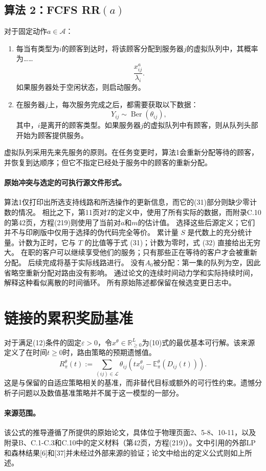 \documentclass{article}
\begin{document}
\subsection*{算法 2：FCFS RR$(a)$}

对于固定动作$a\in\mathcal A$：
\begin{enumerate}
\item 每当有类型为$i$的顾客到达时，将该顾客分配到服务器$j$的虚拟队列中，其概率为……
\[
\frac{x^a_{ij}}{\lambda_i}.
\]
如果服务器处于空闲状态，则启动服务。
\item 在服务器$j$上，每次服务完成之后，都需要获取以下数据：
\[
Y_{ij}\sim\operatorname{Ber}(\theta_{ij}),
\]
其中，$i$是离开的顾客类型。如果服务器$j$的虚拟队列中有顾客，则从队列头部开始为顾客提供服务。
\end{enumerate}
虚拟队列采用先来先服务的原则。在任务变更时，算法1会重新分配等待的顾客，并恢复到达顺序；但它不指定已经处于服务中的顾客的重新分配。

\paragraph{原始冲突与选定的可执行源文件形式。}
算法1仅打印出所选支持线路和所选操作的更新信息，而它的(31)部分则缺少零计数的情况。 相比之下，第11页对$T$的定义中，使用了所有实际的数据，而附录C.10的第42页，方程(219)则使用了当前对$a$和$m$的估计值。 选择这些后源定义；它们并不与印刷版中仅用于选择的伪代码完全等价。 累计量 $S$ 是代数上的充分统计量。计数为正时，它与 $T$ 的比值等于式 (31)；计数为零时，式 (32) 直接给出无穷大。 在职的客户可以继续享受他们的服务；只有那些正在等待的客户才会被重新分配。 后续完成将基于实际线路进行。 没有$A_0$被分配：第一集的队列为空，因此省略空重新分配对路由没有影响。 通过论文的连续时间动力学和实际持续时间，解释这种看似离散的时间循环。
所有原始陈述都保留在候选变更日志中。

\section*{链接的累积奖励基准}

对于满足(12)条件的固定$\varepsilon>0$，令$x^\theta\in\mathbb R_{\geq0}^{L}$为(10)式的最优基本可行解。该来源定义了在时间$t\geq0$时，路由策略的预期遗憾值。
\begin{equation}
R^\theta_\pi(t):=
\sum_{(ij)\in\mathcal L}\theta_{ij}
\left(tx^\theta_{ij}-\mathbb E^\theta_\pi(D_{ij}(t))\right).
\tag{13}
\end{equation}
这是与保留的自适应策略相关的基准，而非替代目标或额外的可行性约束。遗憾分析子问题以及数值基准策略并不属于这一模型的一部分。

\paragraph{来源范围。}
该公式的推导遵循了所提供的原始论文，具体位于物理页面2、5-8、10-11，以及附录B、C.1-C.3和C.10中的定义材料（第42页，方程(219)）。文中引用的外部LP和森林结果[6]和[37]并未经过外部来源的验证；论文中给出的定义公式则如上所述。
\end{document}
